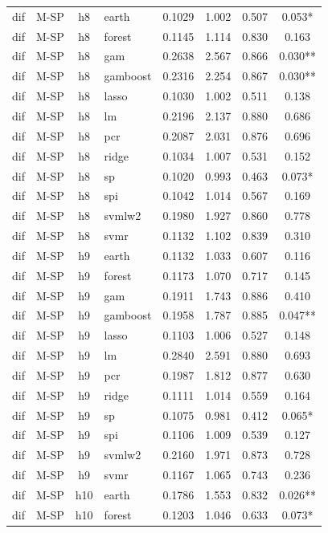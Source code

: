 \begin{ThreePartTable}
\begin{longtable}[t]{llclcccc}
\addlinespace
dif & M-SP & h8 & earth & 0.1029 & 1.002 & 0.507 & 0.053*\\
dif & M-SP & h8 & forest & 0.1145 & 1.114 & 0.830 & 0.163\\
dif & M-SP & h8 & gam & 0.2638 & 2.567 & 0.866 & 0.030**\\
dif & M-SP & h8 & gamboost & 0.2316 & 2.254 & 0.867 & 0.030**\\
dif & M-SP & h8 & lasso & 0.1030 & 1.002 & 0.511 & 0.138\\
dif & M-SP & h8 & lm & 0.2196 & 2.137 & 0.880 & 0.686\\
dif & M-SP & h8 & pcr & 0.2087 & 2.031 & 0.876 & 0.696\\
dif & M-SP & h8 & ridge & 0.1034 & 1.007 & 0.531 & 0.152\\
dif & M-SP & h8 & sp & 0.1020 & 0.993 & 0.463 & 0.073*\\
dif & M-SP & h8 & spi & 0.1042 & 1.014 & 0.567 & 0.169\\
dif & M-SP & h8 & svmlw2 & 0.1980 & 1.927 & 0.860 & 0.778\\
dif & M-SP & h8 & svmr & 0.1132 & 1.102 & 0.839 & 0.310\\
\addlinespace
dif & M-SP & h9 & earth & 0.1132 & 1.033 & 0.607 & 0.116\\
dif & M-SP & h9 & forest & 0.1173 & 1.070 & 0.717 & 0.145\\
dif & M-SP & h9 & gam & 0.1911 & 1.743 & 0.886 & 0.410\\
dif & M-SP & h9 & gamboost & 0.1958 & 1.787 & 0.885 & 0.047**\\
dif & M-SP & h9 & lasso & 0.1103 & 1.006 & 0.527 & 0.148\\
dif & M-SP & h9 & lm & 0.2840 & 2.591 & 0.880 & 0.693\\
dif & M-SP & h9 & pcr & 0.1987 & 1.812 & 0.877 & 0.630\\
dif & M-SP & h9 & ridge & 0.1111 & 1.014 & 0.559 & 0.164\\
dif & M-SP & h9 & sp & 0.1075 & 0.981 & 0.412 & 0.065*\\
dif & M-SP & h9 & spi & 0.1106 & 1.009 & 0.539 & 0.127\\
dif & M-SP & h9 & svmlw2 & 0.2160 & 1.971 & 0.873 & 0.728\\
dif & M-SP & h9 & svmr & 0.1167 & 1.065 & 0.743 & 0.236\\
\addlinespace
dif & M-SP & h10 & earth & 0.1786 & 1.553 & 0.832 & 0.026**\\
dif & M-SP & h10 & forest & 0.1203 & 1.046 & 0.633 & 0.073*\\

\end{longtable}
\end{ThreePartTable}
